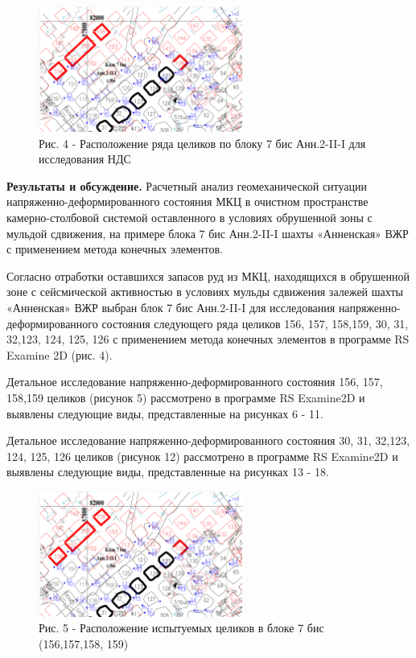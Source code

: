 \begin{figure}[H]
	\centering
	\includegraphics[width=0.6\textwidth]{media/gor/image9}
	\caption*{Рис. 4 - Расположение ряда целиков по блоку 7 бис Анн.2-II-I для
	исследования НДС}
\end{figure}

\begin{multicols}{2}
{\bfseries Результаты и обсуждение.} Расчетный анализ геомеханической
ситуации напряженно-деформированного состояния МКЦ в очистном
пространстве камерно-столбовой системой оставленного в условиях
обрушенной зоны с мульдой сдвижения, на примере блока 7 бис Анн.2-II-I
шахты «Анненская» ВЖР с применением метода конечных элементов.

Согласно отработки оставшихся запасов руд из МКЦ, находящихся в
обрушенной зоне с сейсмической активностью в условиях мульды сдвижения
залежей шахты «Анненская» ВЖР выбран блок 7 бис Анн.2-II-I для
исследования напряженно-деформированного состояния следующего ряда
целиков 156, 157, 158,159, 30, 31, 32,123, 124, 125, 126 с применением
метода конечных элементов в программе RS Examine 2D (рис. 4).

Детальное исследование напряженно-деформированного состояния 156, 157,
158,159 целиков (рисунок 5) рассмотрено в программе RS Examine2D и
выявлены следующие виды, представленные на рисунках 6 - 11.

Детальное исследование напряженно-деформированного состояния 30, 31,
32,123, 124, 125, 126 целиков (рисунок 12) рассмотрено в программе RS
Examine2D и выявлены следующие виды, представленные на рисунках 13 - 18.
\end{multicols}


\begin{figure}[H]
	\centering
	\includegraphics[width=0.6\textwidth]{media/gor/image9}
	\caption*{ Рис. 5 - Расположение испытуемых целиков в блоке 7 бис
	(156,157,158, 159)}
\end{figure}

